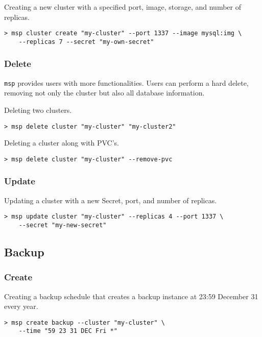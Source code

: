 \noindent Creating a new cluster with a specified port, image, storage, and number of replicas.

\begin{lstlisting}
> msp cluster create "my-cluster" --port 1337 --image mysql:img \
	--replicas 7 --secret "my-own-secret"
\end{lstlisting}

\subsubsection*{Delete}

\texttt{msp} provides users with more functionalities. Users can perform a hard
delete, removing not only the cluster but also all database information.

\noindent Deleting two clusters.

\begin{lstlisting}
> msp delete cluster "my-cluster" "my-cluster2"
\end{lstlisting}

\noindent Deleting a cluster along with PVC’s.

\begin{lstlisting}
> msp delete cluster "my-cluster" --remove-pvc
\end{lstlisting}

\subsubsection*{Update}
\noindent Updating a cluster with a new Secret, port, and number of replicas.

\begin{lstlisting}
> msp update cluster "my-cluster" --replicas 4 --port 1337 \
	--secret "my-new-secret"
\end{lstlisting}

\subsection{Backup}

\subsubsection*{Create}
\noindent Creating a backup schedule that creates a backup instance at 23:59 December 31 every year.

\begin{lstlisting}
> msp create backup --cluster "my-cluster" \
	--time "59 23 31 DEC Fri *"
\end{lstlisting}

